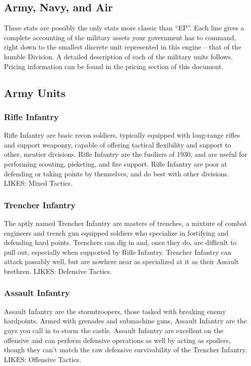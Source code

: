 \documentclass[11 pt]{scrartcl}
\begin{document}
\subsection{Army, Navy, and Air}

These stats are possibly the only stats more classic than ``EP''. Each line gives a complete accounting of the military assets your government has to command, right down to the smallest discrete unit represented in this engine -- that of the humble Division. A detailed description of each of the military units follows. Pricing information can be found in the pricing section of this document.

\subsection*{Army Units}

\subsubsection*{Rifle Infantry}

Rifle Infantry are basic recon soldiers, typically equipped with long-range rifles and support weaponry, capable of offering tactical flexibility and support to other, meatier divisions. Rifle Infantry are the fusiliers of 1930, and are useful for performing scouting, picketing, and fire support. Rifle Infantry are poor at defending or taking points by themselves, and do best with other divisions. LIKES: Mixed Tactics.

\subsubsection*{Trencher Infantry}

The aptly named Trencher Infantry are masters of trenches, a mixture of combat engineers and trench gun equipped soldiers who specialize in fortifying and defending hard points. Trenchers can dig in and, once they do, are difficult to pull out, especially when supported by Rifle Infantry. Trencher Infantry can attack passably well, but are nowhere near as specialized at it as their Assault brethren. LIKES: Defensive Tactics.

\subsubsection*{Assault Infantry}

Assault Infantry are the stormtroopers, those tasked with breaking enemy hardpoints. Armed with grenades and submachine guns, Assault Infantry are the guys you call in to storm the castle. Assault Infantry are excellent on the offensive and can perform defensive operations as well by acting as spoilers, though they can't match the raw defensive survivability of the Trencher Infantry. LIKES: Offensive Tactics.
\end{document}
